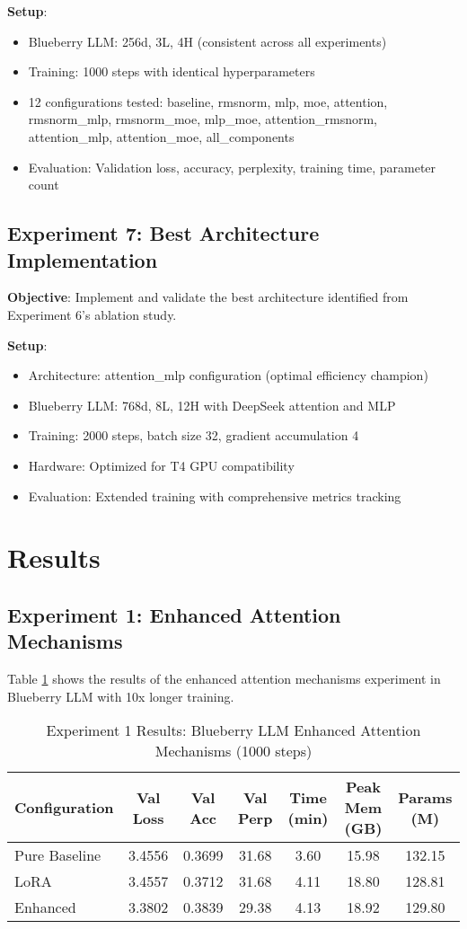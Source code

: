 \documentclass[11pt,a4paper]{article}
\begin{document}
\textbf{Setup}:
\begin{itemize}
    \item Blueberry LLM: 256d, 3L, 4H (consistent across all experiments)
    \item Training: 1000 steps with identical hyperparameters
    \item 12 configurations tested: baseline, rmsnorm, mlp, moe, attention, rmsnorm\_mlp, rmsnorm\_moe, mlp\_moe, attention\_rmsnorm, attention\_mlp, attention\_moe, all\_components
    \item Evaluation: Validation loss, accuracy, perplexity, training time, parameter count
\end{itemize}

\subsection{Experiment 7: Best Architecture Implementation}

\textbf{Objective}: Implement and validate the best architecture identified from Experiment 6's ablation study.

\textbf{Setup}:
\begin{itemize}
    \item Architecture: attention\_mlp configuration (optimal efficiency champion)
    \item Blueberry LLM: 768d, 8L, 12H with DeepSeek attention and MLP
    \item Training: 2000 steps, batch size 32, gradient accumulation 4
    \item Hardware: Optimized for T4 GPU compatibility
    \item Evaluation: Extended training with comprehensive metrics tracking
\end{itemize}

\section{Results}

\subsection{Experiment 1: Enhanced Attention Mechanisms}

Table \ref{tab:exp1_results} shows the results of the enhanced attention mechanisms experiment in Blueberry LLM with 10x longer training.

\begin{table}[H]
\centering
\caption{Experiment 1 Results: Blueberry LLM Enhanced Attention Mechanisms (1000 steps)}
\label{tab:exp1_results}
\begin{tabular}{@{}lcccccc@{}}
\toprule
Configuration & Val Loss & Val Acc & Val Perp & Time (min) & Peak Mem (GB) & Params (M) \\
\midrule
Pure Baseline & 3.4556 & 0.3699 & 31.68 & 3.60 & 15.98 & 132.15 \\
LoRA & 3.4557 & 0.3712 & 31.68 & 4.11 & 18.80 & 128.81 \\
Enhanced & 3.3802 & 0.3839 & 29.38 & 4.13 & 18.92 & 129.80 \\
\bottomrule
\end{tabular}
\end{table}
\end{document}
